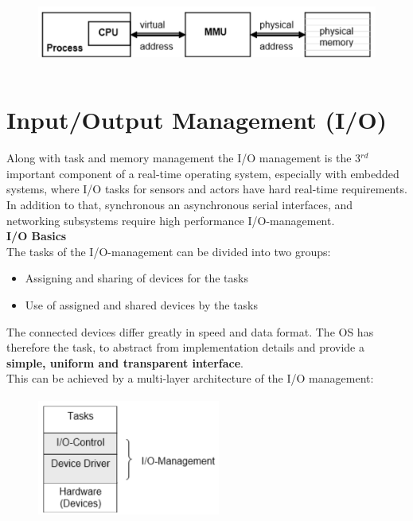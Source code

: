  	\begin{figure}[h]
    \centering
    \includegraphics[width=12cm, height=2.5cm]{Images/image119.png}
    \label{fig:Fig 67}
    \end{figure}
    
\section{Input/Output Management (I/O)}

Along with task and memory management the\textbf{ }I/O management is the 3${}^{rd}$  important component of a real-time operating system, especially with embedded systems, where I/O tasks for sensors and actors have hard real-time requirements.\\

In addition to that, synchronous an asynchronous serial interfaces, and networking subsystems require high performance I/O-management.\\

{\rot\bf I/O Basics}\\

The tasks of the I/O-management can be divided into two groups:

\begin{itemize}
\item  Assigning and sharing of devices for the tasks
\item  Use of assigned and shared devices by the tasks
\end{itemize}

The connected devices differ greatly in speed and data format. The OS has therefore the task, to abstract from implementation details and provide a \textbf{simple, uniform and transparent interface}. \\

This can be achieved by a multi-layer architecture of the I/O management:

 	\begin{figure}[h]
    \centering
    \includegraphics[width=6cm, height=4cm]{Images/image189.png}
    \label{fig:Fig 68}
    \end{figure}
    
